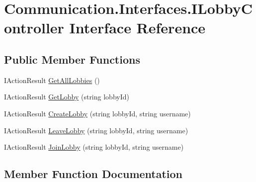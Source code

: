 \hypertarget{interface_communication_1_1_interfaces_1_1_i_lobby_controller}{}\section{Communication.\+Interfaces.\+I\+Lobby\+Controller Interface Reference}
\label{interface_communication_1_1_interfaces_1_1_i_lobby_controller}
\subsection*{Public Member Functions}
\begin{DoxyCompactItemize}
\item 
I\+Action\+Result \mbox{\hyperlink{interface_communication_1_1_interfaces_1_1_i_lobby_controller_a68e8088f8e43f261906c74604ada45b8}{Get\+All\+Lobbies}} ()
\item 
I\+Action\+Result \mbox{\hyperlink{interface_communication_1_1_interfaces_1_1_i_lobby_controller_aed4c7c417faceb72a7e8248728c3a271}{Get\+Lobby}} (string lobby\+Id)
\item 
I\+Action\+Result \mbox{\hyperlink{interface_communication_1_1_interfaces_1_1_i_lobby_controller_a79179036a5010d2f64ce09c0ac67520f}{Create\+Lobby}} (string lobby\+Id, string username)
\item 
I\+Action\+Result \mbox{\hyperlink{interface_communication_1_1_interfaces_1_1_i_lobby_controller_a66b8bdd9794da0454cac2e6aba9b4faf}{Leave\+Lobby}} (string lobby\+Id, string username)
\item 
I\+Action\+Result \mbox{\hyperlink{interface_communication_1_1_interfaces_1_1_i_lobby_controller_aaf8bea84ae5b4d36abe14fc305b055f2}{Join\+Lobby}} (string lobby\+Id, string username)
\end{DoxyCompactItemize}


\subsection{Member Function Documentation}
\mbox{\label{interface_communication_1_1_interfaces_1_1_i_lobby_controller_a79179036a5010d2f64ce09c0ac67520f}} 
